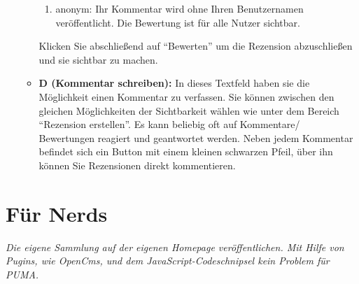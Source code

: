 \documentclass[b5paper,11pt,twoside]{scrbook} %
\begin{document}
\begin{enumerate}
\begin{itemize}
\begin{enumerate}
            \item anonym: Ihr Kommentar wird ohne Ihren Benutzernamen veröffentlicht. Die Bewertung ist für alle Nutzer sichtbar.
        \end{enumerate}
       	Klicken Sie abschließend auf \enquote{Bewerten} um die Rezension abzuschließen und sie sichtbar zu machen.
        \item \textbf{D (Kommentar schreiben):} In dieses Textfeld haben sie die Möglichkeit einen Kommentar zu verfassen. Sie können zwischen den gleichen Möglichkeiten der Sichtbarkeit wählen wie unter dem Bereich \enquote{Rezension erstellen}.
\newline Es kann beliebig oft auf Kommentare/ Bewertungen  reagiert und geantwortet werden. Neben jedem Kommentar befindet sich ein Button mit einem kleinen schwarzen Pfeil, über ihn können Sie Rezensionen direkt kommentieren. 
    \end{itemize}
\end{enumerate}




\newpage
\section{Für Nerds}
\textit{Die eigene Sammlung auf der eigenen Homepage veröffentlichen. Mit Hilfe von Pugins, wie OpenCms,  und dem JavaScript-Codeschnipsel kein Problem für PUMA.}
\end{document}
